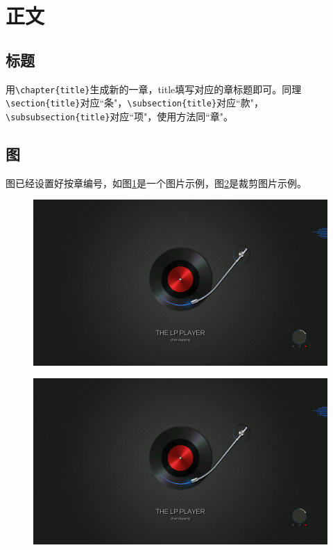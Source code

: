 \documentclass{bucthesis}
\begin{document}
\section{正文}
\subsection{标题}{\par
	用\verb|\chapter{title}|生成新的一章，title填写对应的章标题即可。同理\verb|\section{title}|对应``条"，\verb|\subsection{title}|对应``款"，\verb|\subsubsection{title}|对应``项"，使用方法同``章"。}
\subsection{图}{\par
	图已经设置好按章编号，如图\ref{fig:music}是一个图片示例，图\ref{fig:musictrim}是裁剪图片示例。\par	
	\begin{figure}[!htbp]
		\centering
		\includegraphics[width=0.8\linewidth]{image/music.jpg}\\
		\label{fig:music}
	\end{figure}
	
	\begin{figure}[!htbp]
		\centering
		\includegraphics[trim=700 200 700 200,clip,scale=0.8,width=0.4\linewidth]{image/music.jpg}\\
		\label{fig:musictrim}
	\end{figure}
}
\end{document}
